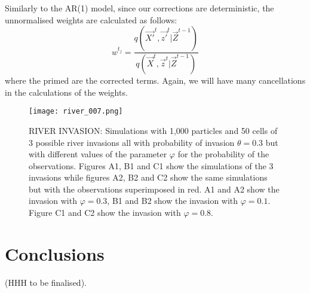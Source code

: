 Similarly to the AR(1) model, since our corrections are deterministic, the unnormalised weights are calculated as follows:
\[
    w^{t_j} = \frac{q(\vec{X'}^{t},\vec{z'}^{t} | \vec{Z}^{t-1})}{q(\vec{X}^{t},\vec{z}^{t} | \vec{Z}^{t-1})}
\]
where the primed are the corrected terms. Again, we will have many cancellations in the calculations of the weights.


\begin{figure*}
  \texttt{[image: river\_007.png]}
\caption{RIVER INVASION: Simulations with 1,000 particles and 50 cells of 3 possible river invasions all with probability of invasion $\theta = 0.3$ but with different values of the parameter $\varphi$ for the probability of the observations. Figures A1, B1 and C1 show the simulations of the 3 invasions while figures A2, B2 and C2 show the same simulations but with the observations superimposed in red. A1 and A2 show the invasion with $\varphi = 0.3$, B1 and B2 show the invasion with $\varphi = 0.1$. Figure C1 and C2 show the invasion with $\varphi = 0.8$.}
\label{fig:2}       %
\end{figure*}
%
\section{Conclusions}

(HHH to be finalised).


